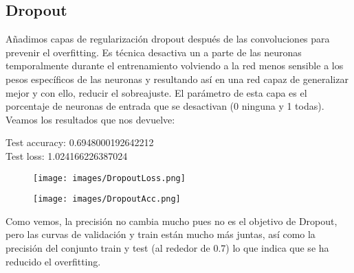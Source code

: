 \documentclass[12pt]{article}
\begin{document}
\subsection*{Dropout}
Añadimos capas de regularización dropout después de las convoluciones para prevenir el overfitting. Es técnica desactiva un a parte de las neuronas temporalmente durante el entrenamiento volviendo a la red menos sensible a los pesos específicos de las neuronas y resultando así en una red capaz de generalizar mejor y con ello, reducir el sobreajuste. El parámetro de esta capa es el porcentaje de neuronas de entrada que se desactivan (0 ninguna y 1 todas). Veamos los resultados que nos devuelve:
\\
\begin{center}
Test accuracy: 0.6948000192642212\\
Test loss: 1.024166226387024
\end{center}
\begin{figure}[H]
\centering
\parbox{8cm}{
\texttt{[image: images/DropoutLoss.png]}
\caption{}
\label{fig:2figsA}}
\begin{minipage}{8cm}
\texttt{[image: images/DropoutAcc.png]}
\caption{}
\label{fig:2figsB}
\end{minipage}
\end{figure}
Como vemos, la precisión no cambia mucho pues no es el objetivo de Dropout, pero las curvas de validación y train están mucho más juntas, así como la precisión del conjunto train y test (al rededor de 0.7) lo que indica que se ha reducido el overfitting.
\end{document}
